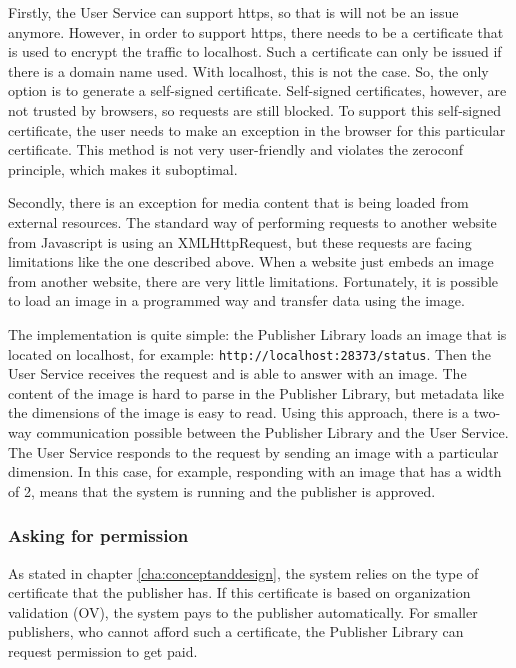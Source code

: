 Firstly, the User Service can support https, so that is will not be an issue anymore. However, in order to support https, there needs to be a certificate that is used to encrypt the traffic to localhost. Such a certificate can only be issued if there is a domain name used. With localhost, this is not the case. So, the only option is to generate a self-signed certificate. Self-signed certificates, however, are not trusted by browsers, so requests are still blocked. To support this self-signed certificate, the user needs to make an exception in the browser for this particular certificate. This method is not very user-friendly and violates the zeroconf principle, which makes it suboptimal.

Secondly, there is an exception for media content that is being loaded from external resources. The standard way of performing requests to another website from Javascript is using an XMLHttpRequest, but these requests are facing limitations like the one described above. When a website just embeds an image from another website, there are very little limitations. Fortunately, it is possible to load an image in a programmed way and transfer data using the image.

The implementation is quite simple: the Publisher Library loads an image that is located on localhost, for example: \texttt{http://localhost:28373/status}. Then the User Service receives the request and is able to answer with an image. The content of the image is hard to parse in the Publisher Library, but metadata like the dimensions of the image is easy to read. Using this approach, there is a two-way communication possible between the Publisher Library and the User Service. The User Service responds to the request by sending an image with a particular dimension. In this case, for example, responding with an image that has a width of 2, means that the system is running and the publisher is approved.

\subsubsection{Asking for permission}
As stated in chapter \ref{cha:conceptanddesign}, the system relies on the type of certificate that the publisher has. If this certificate is based on organization validation (OV), the system pays to the publisher automatically. For smaller publishers, who cannot afford such a certificate, the Publisher Library can request permission to get paid. 

